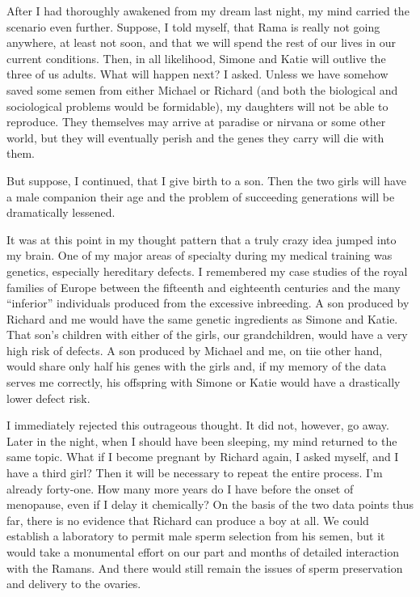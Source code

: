 \documentclass[]{article}
\begin{document}
After I had thoroughly awakened from my dream last night, my mind carried the scenario even further. Suppose, I told myself, that Rama is really not going anywhere, at least not soon, and that we will spend the rest of our lives in our current conditions. Then, in all likelihood, Simone and Katie will outlive the three of us adults. What will happen next? I asked. Unless we have somehow saved some semen from either Michael or Richard (and both the biological and sociological problems would be formidable), my daughters will not be able to reproduce. They themselves may arrive at paradise or nirvana or some other world, but they will eventually perish and the genes they carry will die with them.

But suppose, I continued, that I give birth to a son. Then the two girls will have a male companion their age and the problem of succeeding generations will be dramatically lessened.

It was at this point in my thought pattern that a truly crazy idea jumped into my brain. One of my major areas of specialty during my medical training was genetics, especially hereditary defects. I remembered my case studies of the royal families of Europe between the fifteenth and eighteenth centuries and the many “inferior” individuals produced from the excessive inbreeding. A son produced by Richard and me would have the same genetic ingredients as Simone and Katie. That son’s children with either of the girls, our grandchildren, would have a very high risk of defects. A son produced by Michael and me, on tiie other hand, would share only half his genes with the girls and, if my memory of the data serves me correctly, his offspring with Simone or Katie would have a drastically lower defect risk.

I immediately rejected this outrageous thought. It did not, however, go away. Later in the night, when I should have been sleeping, my mind returned to the same topic. What if I become pregnant by Richard again, I asked myself, and I have a third girl? Then it will be necessary to repeat the entire process. I’m already forty-one. How many more years do I have before the onset of menopause, even if I delay it chemically? On the basis of the two data points thus far, there is no evidence that Richard can produce a boy at all. We could establish a laboratory to permit male sperm selection from his semen, but it would take a monumental effort on our part and months of detailed interaction with the Ramans. And there would still remain the issues of sperm preservation and delivery to the ovaries.
\end{document}
